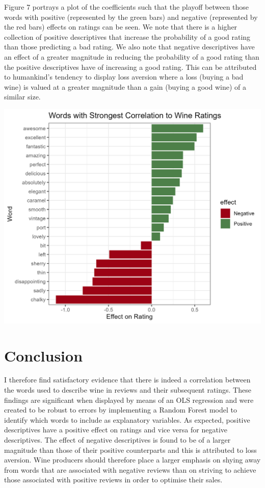 \documentclass[11pt,preprint]{elsarticle}
\let\origfigure\figure
\let\endorigfigure\endfigure
\renewenvironment{figure}[1][2] {
    \expandafter\origfigure\expandafter[H]
} {
    \endorigfigure
}
\numberwithin{equation}{section}
\numberwithin{figure}{section}
\numberwithin{table}{section}
\begin{document}
Figure 7 portrays a plot of the coefficients such that the playoff
between those words with positive (represented by the green bars) and
negative (represented by the red bars) effects on ratings can be seen.
We note that there is a higher collection of positive descriptives that
increase the probability of a good rating than those predicting a bad
rating. We also note that negative descriptives have an effect of a
greater magnitude in reducing the probability of a good rating than the
positive descriptives have of increasing a good rating. This can be
attributed to humankind's tendency to display loss aversion where a loss
(buying a bad wine) is valued at a greater magnitude than a gain (buying
a good wine) of a similar size.

\begin{figure}[H]

{\centering \includegraphics[width=0.8\linewidth]{writeup/fig7} 

}

\caption{Plot of coefficients on OLS regression of top 20 words in reviews identified by RandomForest model}\label{fig:fig7}
\end{figure}

\newpage

\section{Conclusion}\label{conclusion}

\label{Concl} I therefore find satisfactory evidence that there is
indeed a correlation between the words used to describe wine in reviews
and their subsequent ratings. These findings are significant when
displayed by means of an OLS regression and were created to be robust to
errors by implementing a Random Forest model to identify which words to
include as explanatory variables. As expected, positive descriptives
have a positive effect on ratings and vice versa for negative
descriptives. The effect of negative descriptives is found to be of a
larger magnitude than those of their positive counterparts and this is
attributed to loss aversion. Wine producers should therefore place a
larger emphasis on shying away from words that are associated with
negative reviews than on striving to achieve those associated with
positive reviews in order to optimise their sales.
\end{document}
